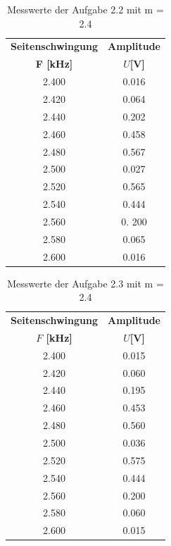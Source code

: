 \documentclass[12pt]{scrartcl}
\begin{document}
  \begin{table}[H] 
     \centering
     \begin{tabular}{|c|c|} 
           \hline \textbf{Seitenschwingung} & \textbf{Amplitude} \\ 
           \textbf{ F [kHz]}    & \textbf{$U$[V]}       \\ \hline
           2.400 & 0.016 \\ \hline
           2.420 & 0.064\\ \hline
           2.440 &0.202 \\ \hline
           2.460 &0.458 \\ \hline
           2.480 & 0.567 \\ \hline  
            2.500 & 0.027 \\ \hline  
            2.520 & 0.565 \\\hline
            2.540  & 0.444 \\ \hline
            2.560 &0. 200\\ \hline
            2.580 &0.065\\ \hline
           2.600 &0.016 \\ \hline
     \end{tabular}
     \caption{Messwerte der Aufgabe 2.2 mit m = 2.4 } \label{tab:Aufgabe2.2_m=24}
 \end{table}

  \begin{table}[H] 
     \centering
     \begin{tabular}{|c|c|} 
           \hline \textbf{Seitenschwingung} & \textbf{Amplitude} \\ 
           \textbf{ $F$ [kHz]}    & \textbf{$U$[V]}       \\ \hline
            2.400 & 0.015 \\ \hline
           2.420 & 0.060\\ \hline
           2.440 &0.195 \\ \hline
           2.460 &0.453 \\ \hline
           2.480 & 0.560 \\ \hline  
            2.500 & 0.036 \\ \hline  
            2.520 & 0.575 \\\hline
            2.540  & 0.444\\ \hline
            2.560 &0.200 \\ \hline
            2.580 &0.060\\ \hline
           2.600 &0.015 \\ \hline
     \end{tabular}
     \caption{Messwerte der Aufgabe 2.3 mit m = 2.4 } \label{tab:Aufgabe2.3_m=2.4}
 \end{table}
\end{document}
